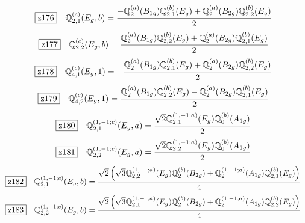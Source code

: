 \documentclass[fleqn,10pt,landscape]{jsarticle}
\begin{document}
\begin{dmath*}
\hspace*{3mm}\fbox{z176}\quad \mathbb{Q}_{2,1}^{(c)}(E_{g},b)=\frac{- \mathbb{Q}_{2}^{(a)}(B_{1g}) \mathbb{Q}_{2,1}^{(b)}(E_{g}) + \mathbb{Q}_{2}^{(a)}(B_{2g}) \mathbb{Q}_{2,2}^{(b)}(E_{g})}{2}
\end{dmath*}
\begin{dmath*}
\hspace*{3mm}\fbox{z177}\quad \mathbb{Q}_{2,2}^{(c)}(E_{g},b)=\frac{\mathbb{Q}_{2}^{(a)}(B_{1g}) \mathbb{Q}_{2,2}^{(b)}(E_{g}) + \mathbb{Q}_{2}^{(a)}(B_{2g}) \mathbb{Q}_{2,1}^{(b)}(E_{g})}{2}
\end{dmath*}
\begin{dmath*}
\hspace*{3mm}\fbox{z178}\quad \mathbb{Q}_{4,1}^{(c)}(E_{g},1)=- \frac{\mathbb{Q}_{2}^{(a)}(B_{1g}) \mathbb{Q}_{2,1}^{(b)}(E_{g}) + \mathbb{Q}_{2}^{(a)}(B_{2g}) \mathbb{Q}_{2,2}^{(b)}(E_{g})}{2}
\end{dmath*}
\begin{dmath*}
\hspace*{3mm}\fbox{z179}\quad \mathbb{Q}_{4,2}^{(c)}(E_{g},1)=\frac{\mathbb{Q}_{2}^{(a)}(B_{1g}) \mathbb{Q}_{2,2}^{(b)}(E_{g}) - \mathbb{Q}_{2}^{(a)}(B_{2g}) \mathbb{Q}_{2,1}^{(b)}(E_{g})}{2}
\end{dmath*}
\begin{dmath*}
\hspace*{3mm}\fbox{z180}\quad \mathbb{Q}_{2,1}^{(1,-1;c)}(E_{g},a)=\frac{\sqrt{2} \mathbb{Q}_{2,1}^{(1,-1;a)}(E_{g}) \mathbb{Q}_{0}^{(b)}(A_{1g})}{2}
\end{dmath*}
\begin{dmath*}
\hspace*{3mm}\fbox{z181}\quad \mathbb{Q}_{2,2}^{(1,-1;c)}(E_{g},a)=\frac{\sqrt{2} \mathbb{Q}_{2,2}^{(1,-1;a)}(E_{g}) \mathbb{Q}_{0}^{(b)}(A_{1g})}{2}
\end{dmath*}
\begin{dmath*}
\hspace*{3mm}\fbox{z182}\quad \mathbb{Q}_{2,1}^{(1,-1;c)}(E_{g},b)=\frac{\sqrt{2} \left(\sqrt{3} \mathbb{Q}_{2,2}^{(1,-1;a)}(E_{g}) \mathbb{Q}_{2}^{(b)}(B_{2g}) + \mathbb{Q}_{2}^{(1,-1;a)}(A_{1g}) \mathbb{Q}_{2,1}^{(b)}(E_{g})\right)}{4}
\end{dmath*}
\begin{dmath*}
\hspace*{3mm}\fbox{z183}\quad \mathbb{Q}_{2,2}^{(1,-1;c)}(E_{g},b)=\frac{\sqrt{2} \left(\sqrt{3} \mathbb{Q}_{2,1}^{(1,-1;a)}(E_{g}) \mathbb{Q}_{2}^{(b)}(B_{2g}) + \mathbb{Q}_{2}^{(1,-1;a)}(A_{1g}) \mathbb{Q}_{2,2}^{(b)}(E_{g})\right)}{4}
\end{dmath*}
\end{document}
